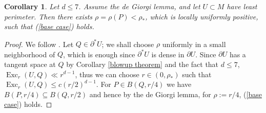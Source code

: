 \documentclass[reqno,11pt]{amsart}
\DeclareMathOperator{\Exc}{Exc}
\newtheorem{corollary}[theorem]{Corollary}
\theoremstyle{definition}
\numberwithin{equation}{section}
\begin{document}
\begin{corollary}\label{DGL base case}
Let $d \leq 7$.
Assume the de Giorgi lemma, and let $U \subset M$ have least perimeter.
Then there exists $\rho = \rho(P) < \rho_*$, which is locally uniformly positive, such that (\ref{base case}) holds.
\end{corollary}
\begin{proof}
We follow \cite[pg109]{Giusti77}.
Let $Q \in \partial^* U$; we shall choose $\rho$ uniformly in a small neighborhood of $Q$, which is enough since $\partial^* U$ is dense in $\partial U$.
Since $\partial U$ has a tangent space at $Q$ by Corollary \ref{blowup theorem} and the fact that $d \leq 7$, $\Exc_r(U, Q) \ll r^{d - 1}$, thus we can choose $r \in (0, \rho_*)$ such that $\Exc_r(U, Q) \leq c(r/2)^{d - 1}$.
For $P \in B(Q, r/4)$ we have $B(P, r/4) \subseteq B(Q, r/2)$ and hence by the de Giorgi lemma, for $\rho := r/4$, (\ref{base case}) holds.
\end{proof}
\end{document}
